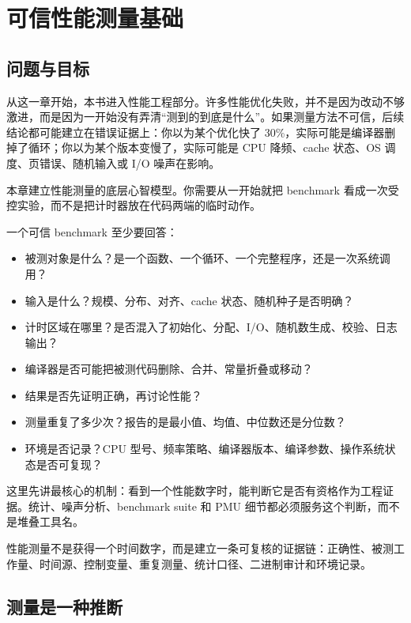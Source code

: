 \chapter{可信性能测量基础}

\section{问题与目标}

从这一章开始，本书进入性能工程部分。许多性能优化失败，并不是因为改动不够激进，而是因为一开始没有弄清“测到的到底是什么”。如果测量方法不可信，后续结论都可能建立在错误证据上：你以为某个优化快了 30\%，实际可能是编译器删掉了循环；你以为某个版本变慢了，实际可能是 CPU 降频、cache 状态、OS 调度、页错误、随机输入或 I/O 噪声在影响。

本章建立性能测量的底层心智模型。你需要从一开始就把 benchmark 看成一次受控实验，而不是把计时器放在代码两端的临时动作。

一个可信 benchmark 至少要回答：

\begin{itemize}
  \item 被测对象是什么？是一个函数、一个循环、一个完整程序，还是一次系统调用？
  \item 输入是什么？规模、分布、对齐、cache 状态、随机种子是否明确？
  \item 计时区域在哪里？是否混入了初始化、分配、I/O、随机数生成、校验、日志输出？
  \item 编译器是否可能把被测代码删除、合并、常量折叠或移动？
  \item 结果是否先证明正确，再讨论性能？
  \item 测量重复了多少次？报告的是最小值、均值、中位数还是分位数？
  \item 环境是否记录？CPU 型号、频率策略、编译器版本、编译参数、操作系统状态是否可复现？
\end{itemize}

这里先讲最核心的机制：看到一个性能数字时，能判断它是否有资格作为工程证据。统计、噪声分析、benchmark suite 和 PMU 细节都必须服务这个判断，而不是堆叠工具名。

\begin{keyidea}
性能测量不是获得一个时间数字，而是建立一条可复核的证据链：正确性、被测工作量、时间源、控制变量、重复测量、统计口径、二进制审计和环境记录。
\end{keyidea}

\section{测量是一种推断}


